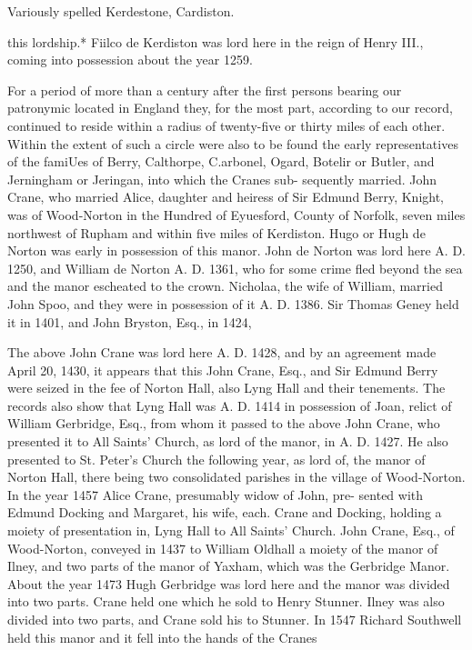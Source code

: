 Variously spelled Kerdestone, Cardiston. 




this lordship.* Fiilco de Kerdiston was lord here in the reign of 
Henry III., coming into possession about the year 1259. 

For a period of more than a century after the first persons 
bearing our patronymic located in England they, for the most 
part, according to our record, continued to reside within a radius 
of twenty-five or thirty miles of each other. Within the extent 
of such a circle were also to be found the early representatives of 
the famiUes of Berry, Calthorpe, C.arbonel, Ogard, Botelir or 
Butler, and Jerningham or Jeringan, into which the Cranes sub- 
sequently married. John Crane, who married Alice, daughter 
and heiress of Sir Edmund Berry, Knight, was of Wood-Norton 
in the Hundred of Eyuesford, County of Norfolk, seven miles 
northwest of Rupham and within five miles of Kerdiston. Hugo 
or Hugh de Norton was early in possession of this manor. John 
de Norton was lord here A. D. 1250, and William de Norton A. 
D. 1361, who for some crime fled beyond the sea and the manor 
escheated to the crown. Nicholaa, the wife of William, married 
John Spoo, and they were in possession of it A. D. 1386. Sir 
Thomas Geney held it in 1401, and John Bryston, Esq., in 1424, 

The above John Crane was lord here A. D. 1428, and by an 
agreement made April 20, 1430, it appears that this John Crane, 
Esq., and Sir Edmund Berry were seized in the fee of Norton 
Hall, also Lyng Hall and their tenements. The records also 
show that Lyng Hall was A. D. 1414 in possession of Joan, relict 
of William Gerbridge, Esq., from whom it passed to the above 
John Crane, who presented it to All Saints' Church, as lord of the 
manor, in A. D. 1427. He also presented to St. Peter's Church 
the following year, as lord of, the manor of Norton Hall, there 
being two consolidated parishes in the village of Wood-Norton. 
In the year 1457 Alice Crane, presumably widow of John, pre- 
sented with Edmund Docking and Margaret, his wife, each. 
Crane and Docking, holding a moiety of presentation in, Lyng 
Hall to All Saints' Church. John Crane, Esq., of Wood-Norton, 
conveyed in 1437 to William Oldhall a moiety of the manor of 
Ilney, and two parts of the manor of Yaxham, which was the 
Gerbridge Manor. About the year 1473 Hugh Gerbridge was 
lord here and the manor was divided into two parts. Crane held 
one which he sold to Henry Stunner. Ilney was also divided 
into two parts, and Crane sold his to Stunner. In 1547 Richard 
Southwell held this manor and it fell into the hands of the Cranes 



